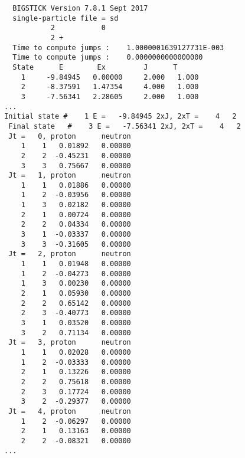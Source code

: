 \begin{verbatim}
  BIGSTICK Version 7.8.1 Sept 2017
  single-particle file = sd
           2           0
           2 +
  Time to compute jumps :    1.0000001639127731E-003
  Time to compute jumps :    0.0000000000000000     
  State      E        Ex         J      T 
    1     -9.84945   0.00000     2.000   1.000
    2     -8.37591   1.47354     4.000   1.000
    3     -7.56341   2.28605     2.000   1.000
...
Initial state #    1 E =   -9.84945 2xJ, 2xT =    4   2
 Final state   #    3 E =   -7.56341 2xJ, 2xT =    4   2
 Jt =   0, proton      neutron 
    1    1   0.01892   0.00000
    2    2  -0.45231   0.00000
    3    3   0.75667   0.00000
 Jt =   1, proton      neutron 
    1    1   0.01886   0.00000
    1    2  -0.03956   0.00000
    1    3   0.02182   0.00000
    2    1   0.00724   0.00000
    2    2   0.04334   0.00000
    3    1  -0.03337   0.00000
    3    3  -0.31605   0.00000
 Jt =   2, proton      neutron 
    1    1   0.01948   0.00000
    1    2  -0.04273   0.00000
    1    3   0.00230   0.00000
    2    1   0.05930   0.00000
    2    2   0.65142   0.00000
    2    3  -0.40773   0.00000
    3    1   0.03520   0.00000
    3    2   0.71134   0.00000
 Jt =   3, proton      neutron 
    1    1   0.02028   0.00000
    1    2  -0.03333   0.00000
    2    1   0.13226   0.00000
    2    2   0.75618   0.00000
    2    3   0.17724   0.00000
    3    2  -0.29377   0.00000
 Jt =   4, proton      neutron 
    1    2  -0.06297   0.00000
    2    1   0.13163   0.00000
    2    2  -0.08321   0.00000
...
\end{verbatim}












